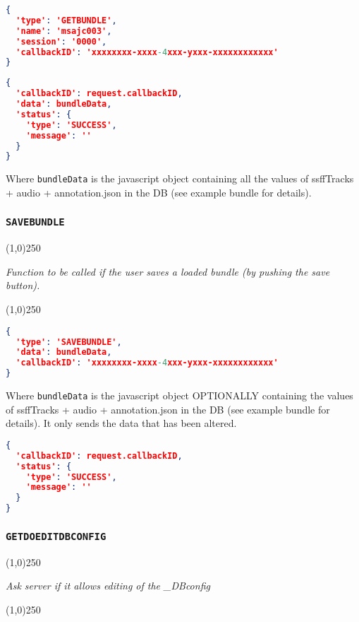 \documentclass[A4,12pt, utf8]{article}
\begin{document}
\begin{lstlisting}[caption=Request content, language=json]
{
  'type': 'GETBUNDLE',
  'name': 'msajc003',
  'session': '0000',
  'callbackID': 'xxxxxxxx-xxxx-4xxx-yxxx-xxxxxxxxxxxx'
}
\end{lstlisting}

\begin{lstlisting}[caption=response content, language=json]
{
  'callbackID': request.callbackID,
  'data': bundleData,
  'status': {
    'type': 'SUCCESS',
    'message': ''
  }
}
\end{lstlisting}
Where \texttt{bundleData} is the javascript object containing all the values of ssffTracks + audio + annotation.json in the DB (see example bundle for details).

\subsubsection{\texttt{SAVEBUNDLE}}
\begin{center}
  \line(1,0){250}

  \textit{Function to be called if the user saves a loaded bundle (by pushing the save button).}

  \line(1,0){250}
\end{center}


\begin{lstlisting}[caption=Request content, language=json]
{
  'type': 'SAVEBUNDLE',
  'data': bundleData,
  'callbackID': 'xxxxxxxx-xxxx-4xxx-yxxx-xxxxxxxxxxxx'
}
\end{lstlisting}
Where \texttt{bundleData} is the javascript object OPTIONALLY containing the values of ssffTracks + audio + annotation.json in the DB (see example bundle for details). It only sends the data that has been altered.

\begin{lstlisting}[caption=response content, language=json]
{
  'callbackID': request.callbackID,
  'status': {
    'type': 'SUCCESS',
    'message': ''
  }
}
\end{lstlisting}

\subsubsection{\texttt{GETDOEDITDBCONFIG}}
\label{GETDOEDITDBCONFIG}
\begin{center}
  \line(1,0){250}

  \textit{Ask server if it allows editing of the \_DBconfig}

  \line(1,0){250}
\end{center}
\end{document}
